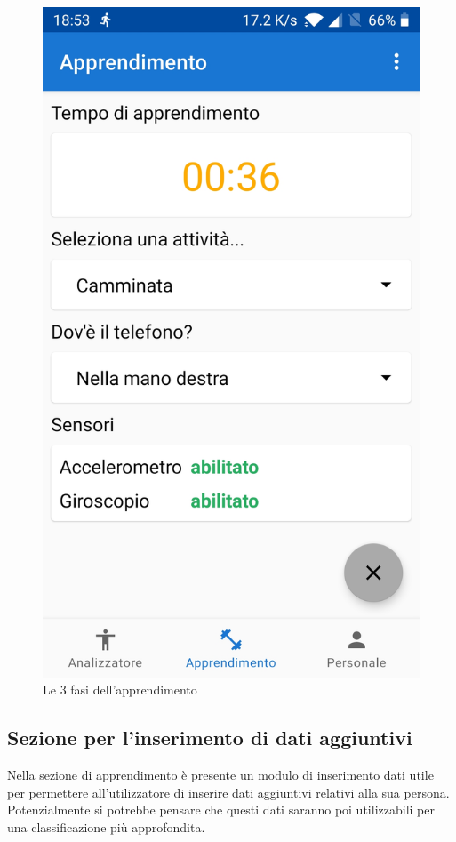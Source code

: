 \begin{figure}[H]
    \includegraphics[scale = 0.10]{assets/images/screenshots/2c_Learning.jpg}
    \caption{Le 3 fasi dell'apprendimento}
    \label{fig:screenshots_learning}
\end{figure}



\subsection{Sezione per l'inserimento di dati aggiuntivi}
Nella sezione di apprendimento è presente un modulo di inserimento dati utile per permettere all'utilizzatore di 
inserire dati aggiuntivi relativi alla sua persona. Potenzialmente si potrebbe pensare che questi dati saranno poi utilizzabili
per una classificazione più approfondita.

